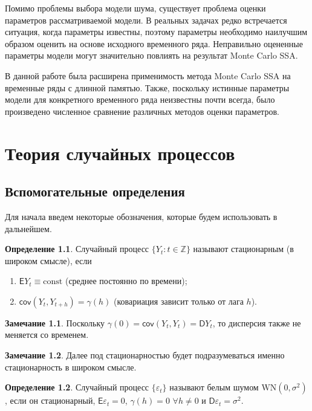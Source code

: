 \documentclass[specialist,
substylefile = spbu_report.rtx,
subf,href,colorlinks=true, 12pt]{disser}
\theoremstyle{definition}
\newtheorem{definition}{Определение}[chapter]
\newtheorem{remark}{Замечание}[chapter]
\newcommand{\Z}{\mathbb{Z}}
\newcommand{\const}{\mathrm{const}}
\begin{document}
Помимо проблемы выбора модели шума, существует проблема оценки параметров рассматриваемой модели. В реальных задачах редко встречается ситуация, когда параметры известны, поэтому параметры необходимо наилучшим образом оценить на основе исходного временного ряда. Неправильно оцененные параметры модели могут значительно повлиять на результат Monte Carlo SSA.

В данной работе была расширена применимость метода Monte Carlo SSA на временные ряды с длинной памятью. Также, поскольку истинные параметры модели для конкретного временного ряда неизвестны почти всегда, было произведено численное сравнение различных методов оценки параметров.


\chapter{Теория случайных процессов}\label{chpt:processes}
\section{Вспомогательные определения}
Для начала введем некоторые обозначения, которые будем использовать в дальнейшем.
\begin{definition}\label{def:stationary}
	Случайный процесс $\{Y_t:t\in\Z\}$ называют стационарным (в широком смысле), если
	\begin{enumerate}
		\item $\mathsf{E}Y_t\equiv\const$ (среднее постоянно по времени);
		\item $\mathsf{cov}(Y_t,Y_{t+h})=\gamma(h)$ (ковариация зависит только от лага $h$).
	\end{enumerate}
\end{definition}
\begin{remark}
	Поскольку $\gamma(0)=\mathsf{cov}(Y_t,Y_t)=\mathsf{D}Y_t$, то дисперсия также не меняется со временем.
\end{remark}
\begin{remark}
	Далее под стационарностью будет подразумеваться именно стационарность в широком смысле.
\end{remark}
\begin{definition}
	Случайный процесс $\{\varepsilon_t\}$ называют белым шумом $\mathrm{WN}(0, \sigma^2)$, если он стационарный, $\mathsf{E}\varepsilon_t=0$, $\gamma(h)=0$ $\forall h\ne 0$ и $\mathsf{D}\varepsilon_t=\sigma^2$.
\end{definition}
\end{document}
